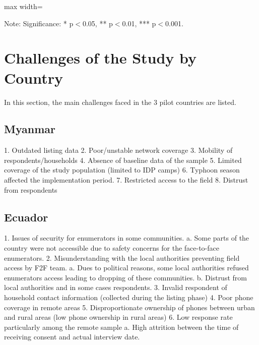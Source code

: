\documentclass[11pt,harvard]{article}
\begin{document}
\begin{table}[htbp]
	\centering
	\begin{adjustbox}{max width=\textwidth}
		\begin{threeparttable}
			\caption{CAR: LCS for Essential Needs vs. Food Security}
			\scriptsize
			 
			\label{tab:LCS_F2F_EN_FS_CAR}
			\begin{tablenotes}
				\item Note: Significance: * p$<$0.05, ** p$<$0.01, *** p$<$0.001. 
			\end{tablenotes}
		\end{threeparttable}
	\end{adjustbox}
\end{table}
\pagebreak

\section{Challenges of the Study by Country}

In this section, the main challenges faced in the 3 pilot countries are listed. 

\subsection{Myanmar}

1.	Outdated listing data
2.	Poor/unstable network coverage
3.	Mobility of respondents/households
4.	Absence of baseline data of the sample 
5.	Limited coverage of the study population (limited to IDP camps)
6.	Typhoon season affected the implementation period.
7.	Restricted access to the field
8.	Distrust from respondents


\subsection{Ecuador}

1.	Issues of security for enumerators in some communities.
		a.	Some parts of the country were not accessible due to safety concerns for the face-to-face enumerators.
2.	Misunderstanding with the local authorities preventing field access by F2F team.
		a.	Dues to political reasons, some local authorities refused enumerators access leading to dropping of these communities.
		b.	Distrust from local authorities and in some cases respondents.
3.	Invalid respondent of household contact information (collected during the listing phase)
4.	Poor phone coverage in remote areas
5.	Disproportionate ownership of phones between urban and rural areas (low phone ownership in rural areas)
6.	Low response rate particularly among the remote sample
		a.	High attrition between the time of receiving consent and actual interview date.
\end{document}

